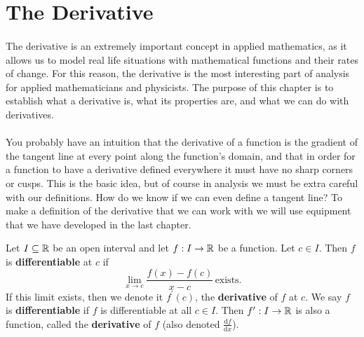 \documentclass[../real_analysis.tex]{subfiles}
\begin{document}
    \section{The Derivative}
        \paragraph{}
        The derivative is an extremely important concept in applied mathematics, as it allows us to model real life situations with mathematical functions and their rates of change. For this reason, the derivative is the most interesting part of analysis for applied mathematicians and physicists. The purpose of this chapter is to establish what a derivative is, what its properties are, and what we can do with derivatives.

        \paragraph{}
        You probably have an intuition that the derivative of a function is the gradient of the tangent line at every point along the function's domain, and that in order for a function to have a derivative defined everywhere it must have no sharp corners or cusps. This is the basic idea, but of course in analysis we must be extra careful with our definitions. How do we know if we can even define a tangent line? To make a definition of the derivative that we can work with we will use equipment that we have developed in the last chapter.
        \begin{definition}
            Let $I\subseteq\mathbb{R}$ be an open interval and let $f: I\to\mathbb{R}$ be a function. Let $c\in I$. Then $f$ is \textbf{differentiable} at $c$ if
            \begin{equation*}
                \lim_{x\to c}\frac{f(x)-f(c)}{x-c}\,\text{exists.}
            \end{equation*}
            If this limit exists, then we denote it $f^\prime(c)$, the \textbf{derivative} of $f$ at $c$. We say $f$ is \textbf{differentiable} if $f$ is differentiable at all $c\in I$. Then $f^\prime:I\to\mathbb{R}$ is also a function, called the \textbf{derivative} of $f$ (also denoted $\frac{\mathrm{d}f}{\mathrm{d}x}$).
        \end{definition}
\end{document}
